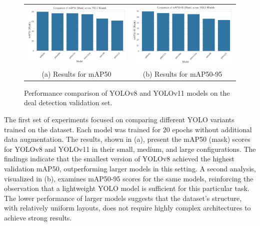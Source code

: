 \documentclass[11pt]{article}
\begin{document}
\begin{figure}[h!]
    \centering
    \begin{tabular}{cc}
    \includegraphics[width=0.5\linewidth]{figures/deal_detection/map50_all_yolo.png} &   \includegraphics[width=0.5\linewidth]{figures/deal_detection/map50_95_all_yolo.png} \\
    (a) Results for mAP50 & (b) Results for mAP50-95 \\[2pt]
    \end{tabular}
    \caption{Performance comparison of YOLOv8 and YOLOv11 models on the deal detection validation set.}
    \label{fig:all_yolo_results}
\end{figure}

The first set of experiments focused on comparing different YOLO variants trained on the dataset. Each model was trained for 20 epochs without additional data augmentation. The results, shown in  (a), present the mAP50 (mask) scores for YOLOv8 and YOLOv11 in their small, medium, and large configurations. The findings indicate that the smallest version of YOLOv8 achieved the highest validation mAP50, outperforming larger models in this setting. A second analysis, visualized in  (b), examines mAP50-95 scores for the same models, reinforcing the observation that a lightweight YOLO model is sufficient for this particular task. The lower performance of larger models suggests that the dataset's structure, with relatively uniform layouts, does not require highly complex architectures to achieve strong results.
\end{document}
